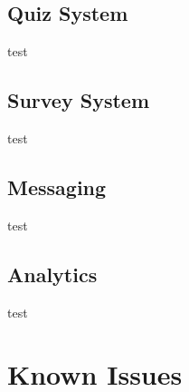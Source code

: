 \subsection{Quiz System}
\label{subsec:design-quiz}
test

\subsection{Survey System}
\label{subsec:design-survey}
test

\subsection{Messaging}
\label{subsec:design-messaging}
test

\subsection{Analytics}
\label{subsec:design-analytics}
test

\section{Known Issues}